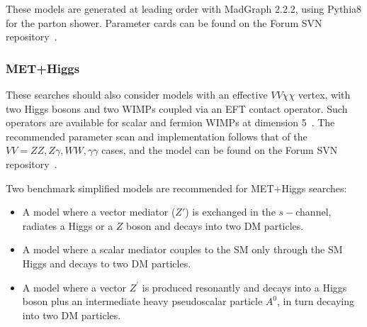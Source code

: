 \documentclass[a4,debug,notitlepage,nobib]{tufte-handout}
\begin{document}
These models are generated at leading
order with MadGraph 2.2.2, using Pythia8 for the parton shower.
Parameter cards can be found on the Forum SVN repository~\cite{ForumSVN_EWEFTD7}.

\subsubsection{MET+Higgs} 

These searches should also consider models with an
effective $VV\chi\chi$ vertex, with two Higgs bosons and two WIMPs coupled
via an EFT contact operator. Such operators are available for scalar
and fermion WIMPs at dimension 5~\cite{Carpenter:2013xra}. The
recommended parameter scan and implementation follows that of the $VV=ZZ,Z \gamma,WW,\gamma \gamma$
cases, and the model can be found on the Forum SVN repository~\cite{ForumSVN_monoHEFTD5}.

Two benchmark simplified models \cite{Carpenter:2013xra} 
are recommended for MET+Higgs searches:
\begin{itemize}
 \item A model where a vector mediator ($Z'$) is exchanged in the $s-$channel, 
 radiates a Higgs or a $Z$ boson and decays into two DM particles. 
 \item A model where a scalar mediator couples to the SM only 
 through the SM Higgs and decays to two DM particles. 
\item A model where a vector $Z^\prime$ is produced resonantly and decays into a Higgs boson
plus an intermediate heavy pseudoscalar particle $A^0$, in turn decaying into two DM particles. 
 	
\end{itemize}
\end{document}
